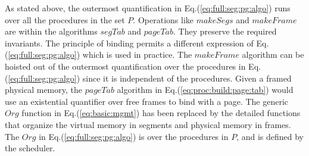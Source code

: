 \documentclass[draft]{article}
\begin{document}
As     stated    above,     the     outermost    quantification     in
Eq.(\ref{eq:full:seg:pg:algo}) runs over all the procedures in the set
$P$.   Operations  like  $makeSegs$  and $makeFrame$  are  within  the
algorithms  $segTab$  and   $pageTab$.   They  preserve  the  required
invariants.  The  principle of binding permits  a different expression
of  Eq.(\ref{eq:full:seg:pg:algo})  which is  used  in practice.   The
$makeFrame$   algorithm  can   be   hoisted  out   of  the   outermost
quantification  over the procedures  in Eq.(\ref{eq:full:seg:pg:algo})
since it  is independent of  the procedures.  Given a  framed physical
memory,  the $pageTab$ algorithm  in Eq.(\ref{eq:proc:build:page:tab})
would use  an existential quantifier over  free frames to  bind with a
page.  The generic $Org$ function in Eq.(\ref{eq:basic:mgmt}) has been
replaced by the detailed functions that organize the virtual memory in
segments   and   physical   memory    in   frames.    The   $Org$   in
Eq.(\ref{eq:full:seg:pg:algo}) is  over the procedures in  $P$, and is
defined by the scheduler.
\end{document}
